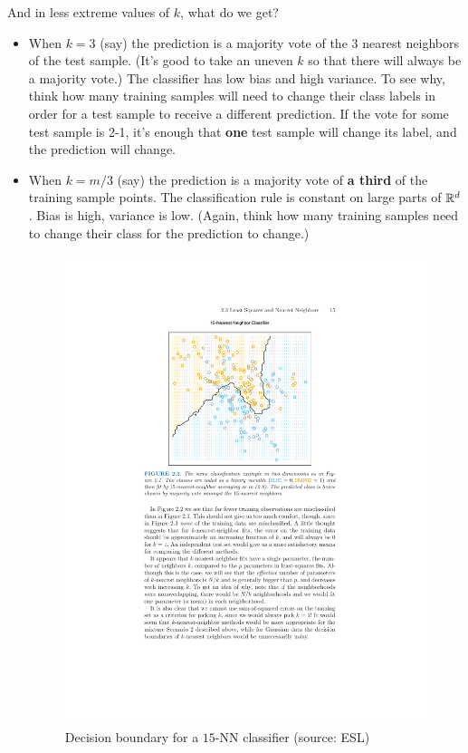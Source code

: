 \documentclass[11pt]{article}
\begin{document}
And in less extreme values of $k$, what do we get?
\begin{itemize}
  \item 
    When $k=3$ (say) the prediction is a majority vote of the 3 nearest
    neighbors of the test sample. (It's good to take an uneven $k$ so that there
    will always be a majority vote.) 
The
classifier has low bias and high variance. To see why, think how many training
samples will need to change their class labels in order for a test sample to
receive a different prediction. If the vote for some test sample is 2-1, it's
enough that {\bf one} test sample will change its label, and the prediction will
change. 

\item When $k=m/3$ (say)  the prediction is a majority vote of {\bf a third} of the
  training sample points. The classification rule is constant on large parts of
  $\mathbb{R}^d$. Bias is high, variance is low. (Again, think how many training samples
  need to change their class for the prediction to change.) 

  \begin{figure}[h!]
  \centering
  \includegraphics{esl_15_nn.pdf}
  \caption{Decision boundary for a $15$-NN classifier (source: ESL)}
\end{figure}

\end{itemize}
\end{document}
